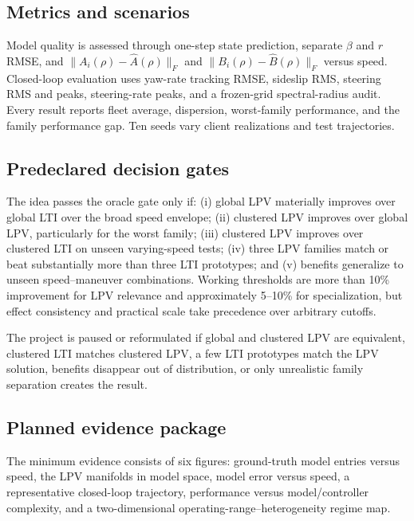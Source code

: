 \subsection{Metrics and scenarios}
Model quality is assessed through one-step state prediction, separate $\beta$ and
$r$ RMSE, and $\lVert A_i(\rho)-\hat A(\rho)\rVert_F$ and
$\lVert B_i(\rho)-\hat B(\rho)\rVert_F$ versus speed. Closed-loop evaluation uses
yaw-rate tracking RMSE, sideslip RMS, steering RMS and peaks, steering-rate peaks,
and a frozen-grid spectral-radius audit. Every result reports fleet average,
dispersion, worst-family performance, and the family performance gap. Ten seeds
vary client realizations and test trajectories.

\subsection{Predeclared decision gates}
The idea passes the oracle gate only if: (i) global LPV materially improves over
global LTI over the broad speed envelope; (ii) clustered LPV improves over global
LPV, particularly for the worst family; (iii) clustered LPV improves over
clustered LTI on unseen varying-speed tests; (iv) three LPV families match or beat
substantially more than three LTI prototypes; and (v) benefits generalize to
unseen speed--maneuver combinations. Working thresholds are more than 10\%
improvement for LPV relevance and approximately 5--10\% for specialization, but
effect consistency and practical scale take precedence over arbitrary cutoffs.

The project is paused or reformulated if global and clustered LPV are equivalent,
clustered LTI matches clustered LPV, a few LTI prototypes match the LPV solution,
benefits disappear out of distribution, or only unrealistic family separation
creates the result.

\subsection{Planned evidence package}
The minimum evidence consists of six figures: ground-truth model entries versus
speed, the LPV manifolds in model space, model error versus speed, a representative
closed-loop trajectory, performance versus model/controller complexity, and a
two-dimensional operating-range--heterogeneity regime map.

